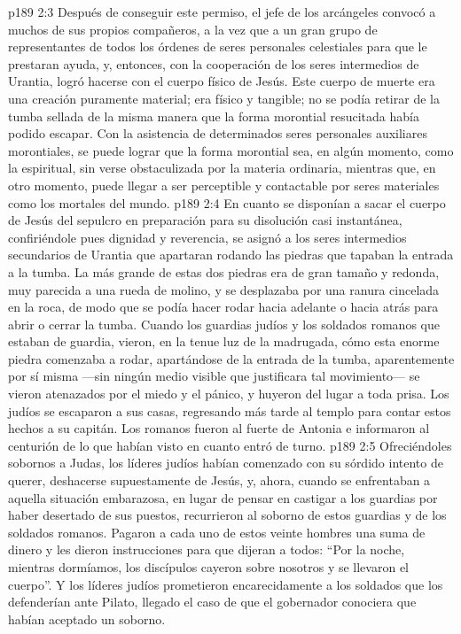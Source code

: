 \vs p189 2:3 Después de conseguir este permiso, el jefe de los arcángeles convocó a muchos de sus propios compañeros, a la vez que a un gran grupo de representantes de todos los órdenes de seres personales celestiales para que le prestaran ayuda, y, entonces, con la cooperación de los seres intermedios de Urantia, logró hacerse con el cuerpo físico de Jesús. Este cuerpo de muerte era una creación puramente material; era físico y tangible; no se podía retirar de la tumba sellada de la misma manera que la forma morontial resucitada había podido escapar. Con la asistencia de determinados seres personales auxiliares morontiales, se puede lograr que la forma morontial sea, en algún momento, como la espiritual, sin verse obstaculizada por la materia ordinaria, mientras que, en otro momento, puede llegar a ser perceptible y contactable por seres materiales como los mortales del mundo.
\vs p189 2:4 En cuanto se disponían a sacar el cuerpo de Jesús del sepulcro en preparación para su disolución casi instantánea, confiriéndole pues dignidad y reverencia, se asignó a los seres intermedios secundarios de Urantia que apartaran rodando las piedras que tapaban la entrada a la tumba. La más grande de estas dos piedras era de gran tamaño y redonda, muy parecida a una rueda de molino, y se desplazaba por una ranura cincelada en la roca, de modo que se podía hacer rodar hacia adelante o hacia atrás para abrir o cerrar la tumba. Cuando los guardias judíos y los soldados romanos que estaban de guardia, vieron, en la tenue luz de la madrugada, cómo esta enorme piedra comenzaba a rodar, apartándose de la entrada de la tumba, aparentemente por sí misma ---sin ningún medio visible que justificara tal movimiento--- se vieron atenazados por el miedo y el pánico, y huyeron del lugar a toda prisa. Los judíos se escaparon a sus casas, regresando más tarde al templo para contar estos hechos a su capitán. Los romanos fueron al fuerte de Antonia e informaron al centurión de lo que habían visto en cuanto entró de turno.
\vs p189 2:5 Ofreciéndoles sobornos a Judas, los líderes judíos habían comenzado con su sórdido intento de querer, deshacerse supuestamente de Jesús, y, ahora, cuando se enfrentaban a aquella situación embarazosa, en lugar de pensar en castigar a los guardias por haber desertado de sus puestos, recurrieron al soborno de estos guardias y de los soldados romanos. Pagaron a cada uno de estos veinte hombres una suma de dinero y les dieron instrucciones para que dijeran a todos: “Por la noche, mientras dormíamos, los discípulos cayeron sobre nosotros y se llevaron el cuerpo”. Y los líderes judíos prometieron encarecidamente a los soldados que los defenderían ante Pilato, llegado el caso de que el gobernador conociera que habían aceptado un soborno.
